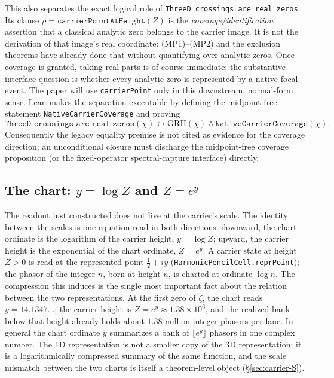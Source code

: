 This also separates the exact logical role of
\texttt{ThreeD\_crossings\_are\_real\_zeros}.  Its clause
\(\rho=\texttt{carrierPointAtHeight}(Z)\) is the
\emph{coverage/identification}
assertion that a classical analytic zero belongs to the carrier image.  It
is not the derivation of that image's real coordinate: (MP1)--(MP2) and the
exclusion theorems have already done that without quantifying over analytic
zeros.  Once coverage is granted, taking real parts is of course immediate;
the substantive interface question is whether every analytic zero is
represented by a native focal event.  The paper will use
\texttt{carrierPoint} only in this downstream, normal-form sense.  Lean makes
the separation executable by defining the midpoint-free statement
\texttt{NativeCarrierCoverage} and proving
\[
 \texttt{ThreeD\_crossings\_are\_real\_zeros}(\chi)
 \leftrightarrow
 \mathrm{GRH}(\chi)\wedge\texttt{NativeCarrierCoverage}(\chi).
\]
Consequently the legacy equality premise is not cited as evidence for the
coverage direction; an unconditional closure must discharge the midpoint-free
coverage proposition (or the fixed-operator spectral-capture interface)
directly.

\subsection{The chart: \texorpdfstring{\(y=\log Z\) and
\(Z=e^{y}\)}{y = log Z and Z = e\^{}y}}\label{sec:grh-chart}

The readout just constructed does not live at the carrier's scale. The
identity between the scales is one equation read in both directions:
downward, the chart ordinate is the logarithm of the carrier height,
\(y=\log Z\); upward, the carrier height is the exponential of the chart
ordinate, \(Z=e^{y}\). A carrier state at height \(Z>0\) is read at the
represented point \(\tfrac12+iy\) (\texttt{HarmonicPencilCell.reprPoint});
the phasor of the integer \(n\), born at height \(n\), is charted at
ordinate \(\log n\). The compression this induces is the single most
important fact about the relation between the two representations. At the
first zero of \(\zeta\), the chart reads \(y=14.1347\ldots\); the carrier
height is \(Z=e^{y}\approx1.38\times10^{6}\), and the realized bank below
that height already holds about \(1.38\) million integer phasors per lane.
In general the chart ordinate \(y\) summarizes a bank of
\(\lfloor e^{y}\rfloor\) phasors in one complex number. The 1D representation
is not a smaller copy of the 3D representation; it is a logarithmically
compressed summary of the same function, and the scale mismatch between the
two charts is itself a theorem-level object (\S\ref{sec:carrier-S}).

